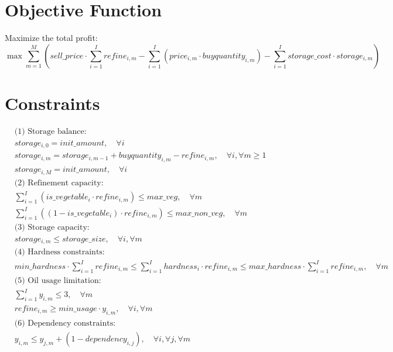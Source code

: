 \documentclass{article}
\begin{document}
\section*{Objective Function}
Maximize the total profit:
\[
\max \sum_{m=1}^{M} \left( sell\_price \cdot \sum_{i=1}^{I} refine_{i,m} - \sum_{i=1}^{I} (price_{i,m} \cdot buyquantity_{i,m}) - \sum_{i=1}^{I} storage\_cost \cdot storage_{i,m} \right)
\]

\section*{Constraints}
\begin{align}
    & \text{(1) Storage balance:} \nonumber \\
    & storage_{i,0} = init\_amount, \quad \forall i \\
    & storage_{i,m} = storage_{i,m-1} + buyquantity_{i,m} - refine_{i,m}, \quad \forall i, \forall m \geq 1 \\
    & storage_{i,M} = init\_amount, \quad \forall i \\

    & \text{(2) Refinement capacity:} \nonumber \\
    & \sum_{i=1}^{I} (is\_vegetable_{i} \cdot refine_{i,m}) \leq max\_veg, \quad \forall m \\
    & \sum_{i=1}^{I} ((1 - is\_vegetable_{i}) \cdot refine_{i,m}) \leq max\_non\_veg, \quad \forall m \\

    & \text{(3) Storage capacity:} \nonumber \\
    & storage_{i,m} \leq storage\_size, \quad \forall i, \forall m \\

    & \text{(4) Hardness constraints:} \nonumber \\
    & min\_hardness \cdot \sum_{i=1}^{I} refine_{i,m} \leq \sum_{i=1}^{I} hardness_{i} \cdot refine_{i,m} \leq max\_hardness \cdot \sum_{i=1}^{I} refine_{i,m}, \quad \forall m \\

    & \text{(5) Oil usage limitation:} \nonumber \\
    & \sum_{i=1}^{I} y_{i,m} \leq 3, \quad \forall m \\
    & refine_{i,m} \geq min\_usage \cdot y_{i,m}, \quad \forall i, \forall m \\

    & \text{(6) Dependency constraints:} \nonumber \\
    & y_{i,m} \leq y_{j,m} + (1 - dependency_{i,j}), \quad \forall i, \forall j, \forall m 
\end{align}
\end{document}
